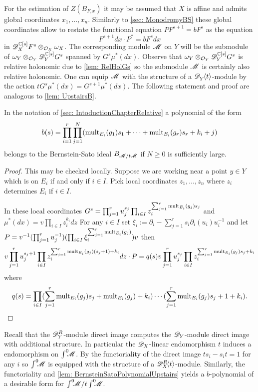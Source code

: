 \noindent
For the estimation of $Z(B_{F,x})$ it may be assumed that $X$ is affine and admits global coordinates $x_1,\ldots,x_n$.
Similarly to \cref{sec: MonodromyBS} these global coordinates allow to restate the functional equation $P F^{s+1} = b F^s$ as the equation
$$F^{s+1}dx \cdot P^* = b F^s dx $$
in $\mathscr{D}_X^{\mathbb{C}[s]} F^s \otimes_{\mathcal{O}_X}\omega_X$.
The corresponding module $\mathscr{M}$ on $Y$ will be the submodule of $\omega_Y\otimes_{\mathcal{O}_Y} \mathscr{D}_Y^{\mathbb{C}[s]} G^s$ spanned by $G^s \mu^*(dx)$.
Observe that $\omega_Y\otimes_{\mathcal{O}_Y} \mathscr{D}_Y^{\mathbb{C}[s]} G^s$ is relative holonomic due to \cref{lem: RelHolGs} so the submodule $\mathscr{M}$ is certainly also relative holonomic.
One can equip $\mathscr{M}$ with the structure of a $\mathscr{D}_{Y}^{}\mkern-5mu\left\langle t \right\rangle$-module by the action $t G^s \mu^*(dx) = G^{s+1} \mu^*(dx)$.
The following statement and proof are analogous to \cref{lem: UpstairsB}.
\begin{lemma}\label{lem: BernsteinSatoPolynomialUpstairs}
  In the notation of \cref{sec: IntoductionChapterRelative} a polynomial of the form
  $$b(s)=\prod_{i=1}^r \prod_{j=1}^N(\operatorname{mult}_{E_i}(g_1)\allowbreak s_1 + \cdots + \operatorname{mult}_{E_i}(g_r)\allowbreak s_r + k_i + j)$$
  belongs to the Bernstein-Sato ideal $B_{\mathscr{M}/t\mathscr{M}}$ if $N\geq 0$ is sufficiently large.
\end{lemma}
\begin{proof}
  This may be checked locally.
  Suppose we are working near a point $y\in Y$ which is on $E_i$ if and only if $i\in I$.
  Pick local coordinates $z_1,\ldots,z_n$ where $z_i$ determines $E_i$ if $i\in I$.

  In these local coordinates $G^s = \prod_{j=1}^r u_j^{s_j} \prod_{i\in I} z_i^{\sum_{j=1}^r \operatorname{mult}_{E_i}(g_j)s_j}$ and $\mu^*(dx) = v \prod_{i\in I} z_i^{k_i} dz$
  For any $i\in I$ set $\xi_i := \partial_i - \sum_{j=1}^{r}s_i\partial_i(u_i)u_i^{-1}$ and let $P = v^{-1}(\prod_{j=1}^r u_j^{-1}) (\prod_{i\in I}\xi_i^{\sum_{j=1}^r\operatorname{mult}_{E_i}(g_j)}) v$ then
  $$v\prod_{j=1}^r u_j^{s_j + 1}\prod_{i\in I}z_i^{\sum_{j=1}^r \operatorname{mult}_{E_i}(g_j)(s_j+1) + k_i}dz \cdot P =  q(s) v\prod_{j=1}^r u_j^{s_j}\prod_{i\in I}z_i^{\sum_{j=1}^r \operatorname{mult}_{E_i}(g_j)s_j + k_i} $$
  where
  $$q(s) = \prod_{i\in I}(\sum_{j=1}^r \operatorname{mult}_{E_i}(g_j)s_j + \operatorname{mult}_{E_i}(g_j) + k_i)\cdots(\sum_{j=1}^r \operatorname{mult}_{E_i}(g_j)s_j + 1 + k_i ).$$
\end{proof}
Recall that the $\mathscr{D}_Y^R$-module direct image computes the $\mathscr{D}_Y$-module direct image with additional structure.
In particular the $\mathscr{D}_X$-linear endomorphism $t$ induces a endomorphism on $\int^0 \mkern -8mu\mathscr{M}$.
By the functoriality of the direct image $ts_i - s_it = 1$ for any $i$ so $\int^0 \mkern -8mu\mathscr{M}$ is equipped with the structure of a $\mathscr{D}_X^R\mkern-5mu\left\langle t \right\rangle$-module.
Similarly, the functoriality and \cref{lem: BernsteinSatoPolynomialUpstairs} yields a $b$-polynomial of a desirable form for $\int^0 \mkern -8mu \mathscr{M}/t\int^0 \mkern -8mu\mathscr{M}$.

